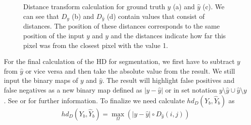\begin{figure}[H]
    \caption[Distance transform calculation]{Distance transform calculation for ground truth $y$ (a) and $\hat{y}$ (c). We can see that $D_y$ (b) and $D_{\hat{y}}$ (d) contain values that consist of distances. The position of these distances corresponds to the same position of the input $y$ and $\hat{y}$ and the distances indicate how far this pixel was from the closest pixel with the value 1.}
    \label{hausdorff_dt}
\end{figure}
For the final calculation of the \ac{HD} for segmentation, we first have to subtract $y$ from $\hat{y}$ or vice versa and then take the absolute value from the result. We still input the binary maps of $y$ and $\hat{y}$. The result will highlight false positives and false negatives as a new binary map defined as $|y-\hat{y}|$ or in set notation $y\setminus\hat{y}\cup\hat{y}\setminus y$. See   or  for further information. To finalize we need calculate $hd_D(Y_b,\hat{Y}_b)$ as
\begin{equation}
    hd_D(Y_b,\hat{Y}_b)=\mathop{\max}_{\Omega}(|y-\hat{y}|\circ D_{\hat{y}}(i,j))
\end{equation}

